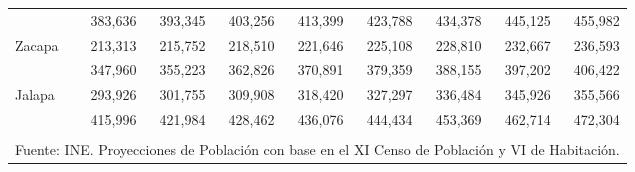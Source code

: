 {\begin{center}
\begin{tabular}{lrrrrrrrr}
			\rowcolor{color1!10!white} \multicolumn{1}{l}{Izabal}	&	 383,636 	&	 393,345 	&	 403,256 	&	 413,399 	&	 423,788 	&	 434,378 	&	 445,125 	&	 455,982 	\\
			\multicolumn{1}{l}{Zacapa}	&	 213,313 	&	 215,752 	&	 218,510 	&	 221,646 	&	 225,108 	&	 228,810 	&	 232,667 	&	 236,593 	\\
			\rowcolor{color1!10!white} \multicolumn{1}{l}{Chiquimula}	&	 347,960 	&	 355,223 	&	 362,826 	&	 370,891 	&	 379,359 	&	 388,155 	&	 397,202 	&	 406,422 	\\
			\multicolumn{1}{l}{Jalapa}	&	 293,926 	&	 301,755 	&	 309,908 	&	 318,420 	&	 327,297 	&	 336,484 	&	 345,926 	&	 355,566 	\\
			\rowcolor{color1!10!white} \multicolumn{1}{l}{Jutiapa}	&	 415,996 	&	 421,984 	&	 428,462 	&	 436,076 	&	 444,434 	&	 453,369 	&	 462,714 	&	 472,304 	\\
			\hline
			&&&&&&&&\\[-0.28cm]
			\multicolumn{9}{l}{\footnotesize Fuente:  INE. Proyecciones de Población con base en el XI Censo de Población y VI de Habitación.}
		\end{tabular}\addtocounter{Cuadro}{1}
	\end{center}}


